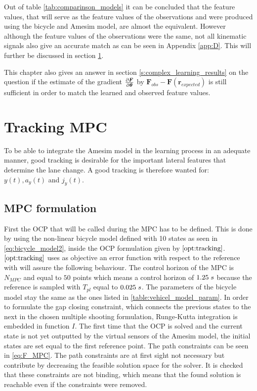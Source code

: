 Out of table \ref{tab:comparinson_models} it can be concluded that the feature values, that will serve as the feature values of the observations and were produced using the bicycle and Amesim model, are almost the equivalent. However although the feature values of the observations were the same, not all kinematic signals also give an accurate match as can be seen in Appendix \ref{app:D}. This will further be discussed in section \ref{s:tracking_mpc}. 

This chapter also gives an answer in section \ref{s:complex_learning_results} on the question if the estimate of the gradient $\pdv{\bm{F}}{\bm{\theta}}$ by $ \bm{F}_{obs} - \bm{F}(\bm{r}_{expected})$ is still sufficient in order to match the learned and observed feature values.

\section{Tracking MPC} 
\label{s:tracking_mpc}
To be able to integrate the Amesim model in the learning process in an adequate manner, good tracking is desirable for the important lateral features that determine the lane change. A good tracking is therefore wanted for: $y(t), a_y(t)$ and $j_y(t)$.

\subsection{MPC formulation}
First the OCP that will be called during the MPC has to be defined. This is done by using the non-linear bicycle model defined with 10 states as seen in \ref{eq:bicycle_model2}, inside the OCP formulation given by $\ref{opt:tracking}$. $\ref{opt:tracking}$ uses as objective an error function with respect to the reference with will assure the following behaviour. The control horizon of the MPC is $N_{MPC}$ and equal to $50$ points which means a control horizon of $1.25 \hspace{1mm}s$ because the reference is sampled with $T_{pl}$ equal to $0.025\hspace{1mm}s$. The parameters of the bicycle model stay the same as the ones listed in \ref{table:vehicel_model_param}. In order to formulate the gap closing constraint, which connects the previous states to the next in the chosen multiple shooting formulation, Runge-Kutta integration is embedded in function $I$.  
The first time that the OCP is solved and the current state is not yet outputted by the virtual sensors of the Amesim model, the initial states are set equal to the first reference point. The path constraints can be seen in \ref{eq:F_MPC}. The path constraints are at first sight not necessary but contribute by decreasing the feasible solution space for the solver. It is checked that these constraints are not binding, which means that the found solution is reachable even if the constraints were removed. 

